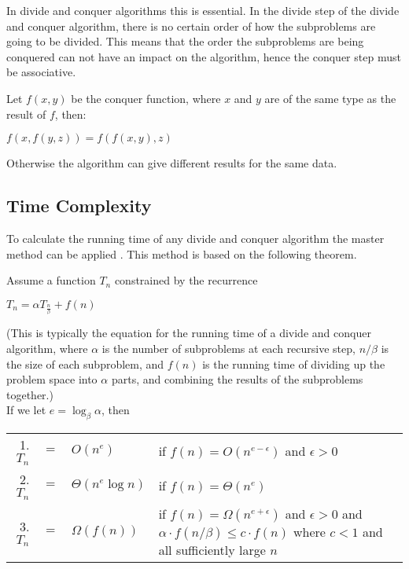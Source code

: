 In divide and conquer algorithms this is essential. In the divide step of the
divide and conquer algorithm, there is no certain order of how the subproblems
are going to be divided. This means that the order the subproblems are being
conquered can not have an impact on the algorithm, hence the conquer step must be
associative.

\begin{example}\label{assprop}
Let $f(x,y)$ be the conquer function, where $x$ and $y$ are of the same type as
the result of $f$, then:
\begin{center}
$f(x,f(y,z)) = f(f(x,y),z)$
\end{center}
Otherwise the algorithm can give different results for the same data.
\end{example}

\subsection{Time Complexity}
To calculate the running time of any divide and conquer algorithm the master
method can be applied \cite{Cormen}. This method is based on the following
theorem.

\begin{theorem} $ $ \\
Assume a function $T_n$ constrained by the recurrence
\begin{center}
$T_n = {\alpha}T_{\frac{n}{\beta}}+ f(n)$
\end{center}
(This is typically the equation for the running time of a divide and conquer
algorithm, where $\alpha$ is the number of subproblems at each recursive step,
$n/\beta$ is the size of each subproblem, and $f(n)$ is the running time of
dividing up the problem space into $\alpha$ parts, and combining the results
of the subproblems together.)\\
If we let $e = \log_\beta \alpha$, then
\begin{center}
\begin{tabular}{r c l l}
1. $T_n$ & $=$ & $O(n^{e})$ &  if $f(n) = O(n^{e - \epsilon})$ and $\epsilon > 0$\\
2. $T_n$ & $=$ & $\Theta(n^{e} \log n)$ & if $f(n) = \Theta(n^e)$\\
3. $T_n$ & $=$ & $\Omega(f(n))$ & \begin{minipage}[t]{0.6 \columnwidth}
  if $f(n) = \Omega(n^{e+\epsilon})$ and $\epsilon > 0$
  and $\alpha \cdot f(n/\beta) \leq c \cdot f(n)$
  where $c < 1$ and all sufficiently large $n$
  \end{minipage}
\end{tabular}
\end{center}
\qeda
\end{theorem}

